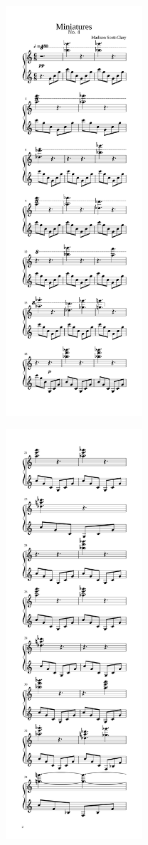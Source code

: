 \begin{paracol}{2}
\begin{rightcolumn*}
\noindent\includegraphics[width=2in]{assets/static/miniatures/4-1.png}

  \begin{flushright}
\noindent\includegraphics[width=2in]{assets/static/miniatures/4-2.png}
\end{flushright}


\end{rightcolumn*}
\end{paracol}
